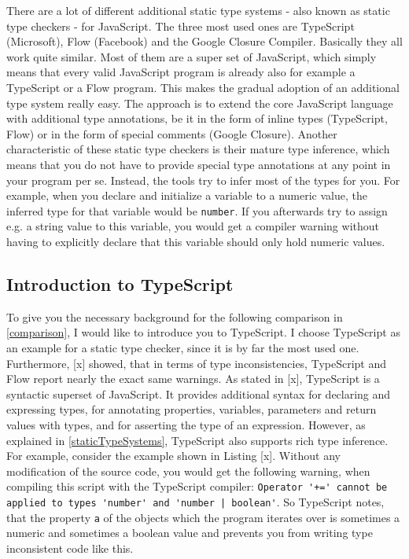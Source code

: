 \documentclass[runningheads,a4paper]{llncs}
\begin{document}
There are a lot of different additional static type systems - also known as static type checkers - for JavaScript.
The three most used ones are TypeScript (Microsoft), Flow (Facebook) and the Google Closure Compiler.
Basically they all work quite similar.
Most of them are a super set of JavaScript, which simply means that every valid JavaScript program is already also for example a TypeScript or a Flow program.
This makes the gradual adoption of an additional type system really easy.
The approach is to extend the core JavaScript language with additional type annotations, be it in the form of inline types (TypeScript, Flow) or in the form of special comments (Google Closure).
Another characteristic of these static type checkers is their mature type inference, which means that you do not have to provide special type annotations at any point in your program per se.
Instead, the tools try to infer most of the types for you. 
For example, when you declare and initialize a variable to a numeric value, the inferred type for that variable would be \lstinline[columns=fixed]{number}.
If you afterwards try to assign e.g. a string value to this variable, you would get a compiler warning without having to explicitly declare that this variable should only hold numeric values.


\subsection{Introduction to TypeScript}

To give you the necessary background for the following comparison in \ref{comparison}, I would like to introduce you to TypeScript.
I choose TypeScript as an example for a static type checker, since it is by far the most used one.
Furthermore, [x] showed, that in terms of type inconsistencies, TypeScript and Flow report nearly the exact same warnings.
As stated in [x], TypeScript is a syntactic superset of JavaScript.
It provides additional syntax for declaring and expressing types, for annotating properties, variables, parameters and return values with types, and for asserting the type of an expression.
However, as explained in \ref{staticTypeSystems}, TypeScript also supports rich type inference.
For example, consider the example shown in Listing [x]. 
Without any modification of the source code, you would get the following warning, when compiling this script with the TypeScript compiler:
\lstinline[columns=fixed]{Operator '+=' cannot be applied to types 'number' and 'number | boolean'}.
So TypeScript notes, that the property \lstinline[columns=fixed]{a} of the objects which the program iterates over is sometimes a numeric and sometimes a boolean value and prevents you from writing type inconsistent code like this.
\end{document}
